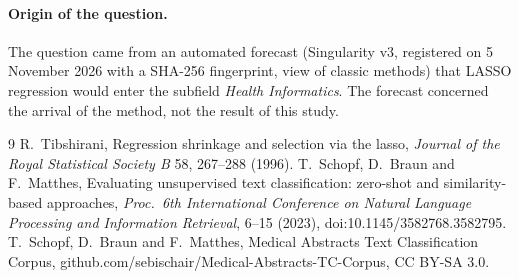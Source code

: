 \documentclass[11pt]{article}
\begin{document}
\paragraph{Origin of the question.} The question came from an automated forecast (Singularity v3, registered on 5
November 2026 with a SHA-256 fingerprint, view of classic methods) that LASSO regression would enter the subfield \emph{Health Informatics}.
The forecast concerned the arrival of the method, not the result of this study.

\begin{thebibliography}{9}
 R.~Tibshirani, Regression shrinkage and selection via the lasso, \emph{Journal of the Royal
Statistical Society B} 58, 267--288 (1996).
 T.~Schopf, D.~Braun and F.~Matthes, Evaluating unsupervised text classification: zero-shot and
similarity-based approaches, \emph{Proc.\ 6th International Conference on Natural Language Processing and Information
Retrieval}, 6--15 (2023), doi:10.1145/3582768.3582795.
 T.~Schopf, D.~Braun and F.~Matthes, Medical Abstracts Text Classification Corpus,
github.com/sebischair/Medical-Abstracts-TC-Corpus, CC BY-SA 3.0.
\end{thebibliography}
\end{document}
